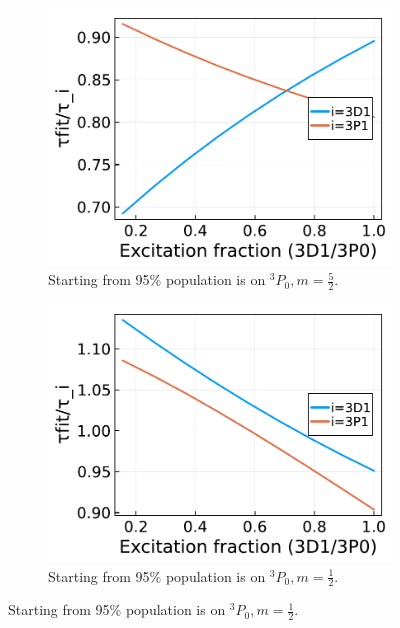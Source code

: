 \documentclass{article}
\begin{document}
\begin{figure}
    \centering
    \begin{subfigure}[b]{.49\linewidth}
        \includegraphics[width=\linewidth]{tauratio_m=2.5_S=0.05.pdf}
        \caption{Starting from 95\% population is on $^3P_0, m=\frac{5}{2}$.}
    \end{subfigure}
    \begin{subfigure}[b]{.49\linewidth}
        \includegraphics[width=\linewidth]{tauratio_m=0.5_S=0.05.pdf}
        \caption{Starting from 95\% population is on $^3P_0, m=\frac{1}{2}$. }
    \end{subfigure} 


\end{figure}
\end{document}

